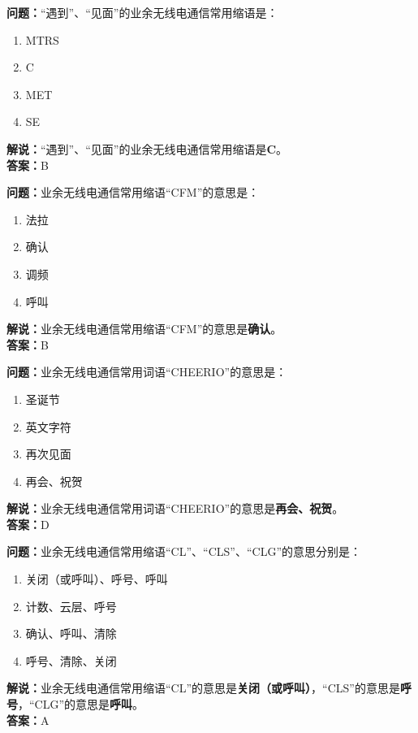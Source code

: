 \bigskip


\noindent\textbf{问题：}“遇到”、“见面”的业余无线电通信常用缩语是：
\begin{enumerate}[label=\Alph*), leftmargin=3em]
\item MTRS
\item C
\item MET
\item SE
\end{enumerate}
\noindent\textbf{解说：}“遇到”、“见面”的业余无线电通信常用缩语是\textbf{C}。\\\noindent\textbf{答案：}B


\bigskip


\noindent\textbf{问题：}业余无线电通信常用缩语“CFM”的意思是：
\begin{enumerate}[label=\Alph*), leftmargin=3em]
\item 法拉
\item 确认
\item 调频
\item 呼叫
\end{enumerate}
\noindent\textbf{解说：}业余无线电通信常用缩语“CFM”的意思是\textbf{确认}。\\\noindent\textbf{答案：}B

\bigskip


\noindent\textbf{问题：}业余无线电通信常用词语“CHEERIO”的意思是：
\begin{enumerate}[label=\Alph*), leftmargin=3em]
\item 圣诞节
\item 英文字符
\item 再次见面
\item 再会、祝贺
\end{enumerate}
\noindent\textbf{解说：}业余无线电通信常用词语“CHEERIO”的意思是\textbf{再会、祝贺}。\\\noindent\textbf{答案：}D



\bigskip


\noindent\textbf{问题：}业余无线电通信常用缩语“CL”、“CLS”、“CLG”的意思分别是：
\begin{enumerate}[label=\Alph*), leftmargin=3em]
\item 关闭（或呼叫）、呼号、呼叫
\item 计数、云层、呼号
\item 确认、呼叫、清除
\item 呼号、清除、关闭
\end{enumerate}
\noindent\textbf{解说：}业余无线电通信常用缩语“CL”的意思是\textbf{关闭（或呼叫）}，“CLS”的意思是\textbf{呼号}，“CLG”的意思是\textbf{呼叫}。\\\noindent\textbf{答案：}A

